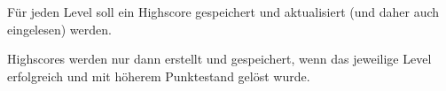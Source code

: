 F\"ur jeden Level soll ein Highscore gespeichert und aktualisiert
(und daher auch eingelesen) werden. 



Highscores werden nur dann erstellt und gespeichert, wenn das
jeweilige Level erfolgreich und mit h\"oherem Punktestand gel\"ost wurde.
